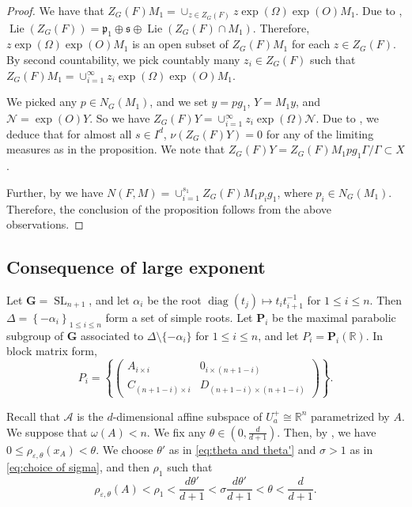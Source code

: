 \documentclass[12pt,reqno]{amsart}
\newcommand{\SL}{\operatorname{SL}}
\numberwithin{equation}{section}
\theoremstyle{plain}
\theoremstyle{definition}
\theoremstyle{remark}
\newcommand\bfG{\mathbf{G}}
\newcommand\bfP{\mathbf{P}}
\newcommand\bbR{\mathbb{R}}
\newcommand\cA{\mathcal{A}}
\newcommand\cN{\mathcal{N}}
\newcommand\fp{\mathfrak{p}}
\newcommand\fs{\mathfrak{s}}
\newcommand{\R}{\mathbb{R}}
\newcommand{\eps}{\varepsilon}
\DeclareMathOperator{\diag}{diag}
\DeclareMathOperator{\Lie}{Lie}
\begin{document}
\begin{proof}
    We have that $Z_G(F)M_1=\cup_{z\in Z_G(F)} z\exp(\Omega)\exp(O)M_1$. Due to , 
    $\Lie(Z_G(F))=\fp_1\oplus \fs\oplus \Lie(Z_G(F)\cap M_1)$. Therefore, $z\exp(\Omega)\exp(O)M_1$ is an open subset of $Z_G(F)M_1$ for each $z\in Z_G(F)$. By second countability, we pick countably many $z_i\in Z_G(F)$ such that $Z_G(F)M_1=\cup_{i=1}^\infty z_i\exp(\Omega)\exp(O)M_1$. 
    
    We picked any $p\in N_G(M_1)$, and we set $y=pg_1$, $Y=M_1y$, and $\cN=\exp(O)Y$. So we have $Z_G(F)Y=\cup_{i=1}^\infty z_i\exp(\Omega)\cN$. Due to , we deduce that for almost all $s\in I^d$, $\nu(Z_G(F)Y)=0$ for any of the limiting measures as in the proposition. We note that $Z_G(F)Y=Z_G(F)M_1pg_1\Gamma/\Gamma\subset X$. 

    Further, by  we have $N(F,M)=\cup_{i=1}^{s_1} Z_G(F)M_1p_ig_1$, where $p_i\in N_G(M_1)$. Therefore, the conclusion of the proposition follows from the above observations. 
\end{proof}

\subsection{Consequence of large exponent}

    Let $\bfG=\SL_{n+1}$, and let $\alpha_i$ be the root $\diag(t_j)\mapsto t_it_{i+1}^{-1}$ for $1\leq i\leq n$. Then $\Delta=\left\{ -\alpha_i \right\}_{1\leq i\leq n}$ form a set of simple roots. Let $\bfP_i$ be the maximal parabolic subgroup of $\bfG$ associated to $\Delta\setminus\{-\alpha_i\}$ for $1\leq i\leq n$, and let $P_i=\bfP_i(\bbR)$. In block matrix form,
	\begin{equation} \label{eq:Pi}
	P_i = \left\{
	\begin{pmatrix}
	A_{i\times i} & 0_{i\times(n+1-i)} \\
	C_{(n+1-i)\times i} & D_{(n+1-i)\times(n+1-i)}
	\end{pmatrix}
	\right\}.
    \end{equation}

    Recall that $\cA$ is the $d$-dimensional affine subspace of $U_a^+\cong \R^n$ parametrized by $A$.
    We suppose that $\omega(A)<n$. We fix any $\theta\in (0,\frac{d}{d+1})$. Then, by \cite[Proposition 4.1]{SY24TAMS}, we have $0\leq \rho_{\eps,\theta}(x_A)<\theta$. 
    We choose $\theta'$ as in \eqref{eq:theta and theta'} and  $\sigma>1$ as in \eqref{eq:choice of sigma}, and then $\rho_1$ such that 
    \begin{equation} \label{eq:choice of sigma2}
        \rho_{\eps,\theta}(A) <\rho_1<\frac{d\theta'}{d+1}<\sigma\frac{d\theta'}{d+1}<\theta <\frac{d}{d+1}.
    \end{equation}
    
\end{document}
